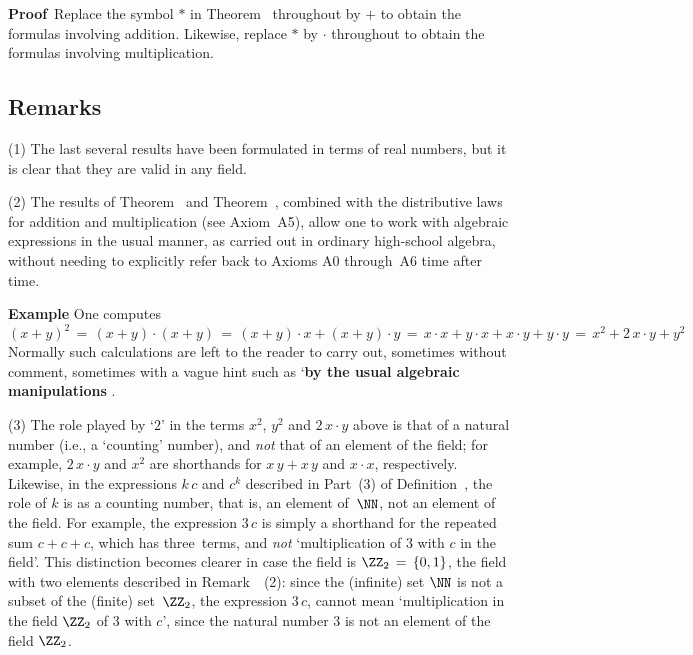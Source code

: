 \V

        {\bf Proof}\, Replace the symbol ${\ast}$ in Theorem~ throughout by $+$ to obtain the formulas involving addition.
    Likewise, replace ${\ast}$ by ${\cdot}$ throughout to obtain the formulas involving multiplication.

\V


            \subsection{\small{\bf Remarks}}
            \label{RemrkB10.35}

\V

\hspace*{\parindent} (1) The last several results have been formulated in terms of real numbers, but it is clear that they are valid in any field.

\V

        (2) The results of Theorem~ and Theorem~, combined with the distributive laws for addition and multiplication
    (see Axiom~A5), allow one to work with algebraic expressions in the usual manner,
    as carried out in ordinary high-school algebra, without needing to explicitly refer back to Axioms A0 through~A6 time after time.

\V

        {\bf Example} One computes
        \begin{displaymath}
        (x+y)^{2} \,=\, (x+y){\cdot}(x+y) \,=\, (x+y){\cdot}x + (x+y){\cdot}y
     \,=\, 
        x{\cdot}x + y{\cdot}x + x{\cdot}y + y{\cdot}y
     \,=\, 
        x^{2} + 2\,x{\cdot}y + y^{2}
        \end{displaymath}
    Normally such calculations are left to the reader to carry out, sometimes without comment,
    sometimes with a vague hint such as `{\bf by the usual algebraic manipulations}
    .

\V

        (3) The role played by `$2$' in the terms $x^{2}$, $y^{2}$ and $2\,x{\cdot}y$ above is that of a natural number (i.e., a `counting' number),
    and {\em not} that of an element of the field; for example, $2\,x{\cdot}y$ and $x^{2}$ are shorthands for $x\,y + x\,y$ and $x{\cdot}x$, respectively.
    Likewise, in the expressions $k\,c$ and $c^{k}$ described in Part~(3) of Definition~,
    the role of $k$ is as a counting number, that is, an element of~${\NN}$, not an element of the field.
    For example, the expression $3\,c$ is simply a shorthand for the repeated sum $c+c+c$,
    which has three~terms, and {\em not} `multiplication of $3$ with $c$ in the field'.
    This distinction becomes clearer in case the field is ${\ZZ}_{2} \,=\, \{0,1\}$, the field with two elements described in Remark~~(2):
    since the (infinite) set ${\NN}$ is not a subset of the (finite) set~${\ZZ}_{2}$, the expression $3\,c$,
    cannot mean `multiplication in the field ${\ZZ}_{2}$ of $3$ with $c$', since the natural number $3$ is not an element of the field ${\ZZ}_{2}$.

